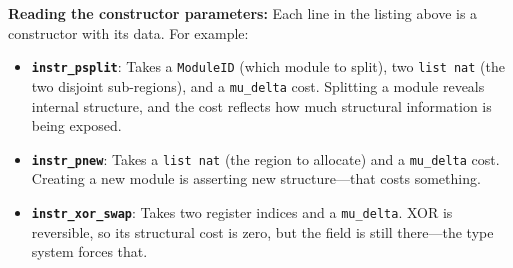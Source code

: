 \textbf{Reading the constructor parameters:} Each line in the listing above is a constructor with its data. For example:
\begin{itemize}
    \item \textbf{\texttt{instr\_psplit}}: Takes a \texttt{ModuleID} (which module to split), two \texttt{list nat} (the two disjoint sub-regions), and a \texttt{mu\_delta} cost. Splitting a module reveals internal structure, and the cost reflects how much structural information is being exposed.
    \item \textbf{\texttt{instr\_pnew}}: Takes a \texttt{list nat} (the region to allocate) and a \texttt{mu\_delta} cost. Creating a new module is asserting new structure---that costs something.
    \item \textbf{\texttt{instr\_xor\_swap}}: Takes two register indices and a \texttt{mu\_delta}. XOR is reversible, so its structural cost is zero, but the field is still there---the type system forces that.
\end{itemize}

